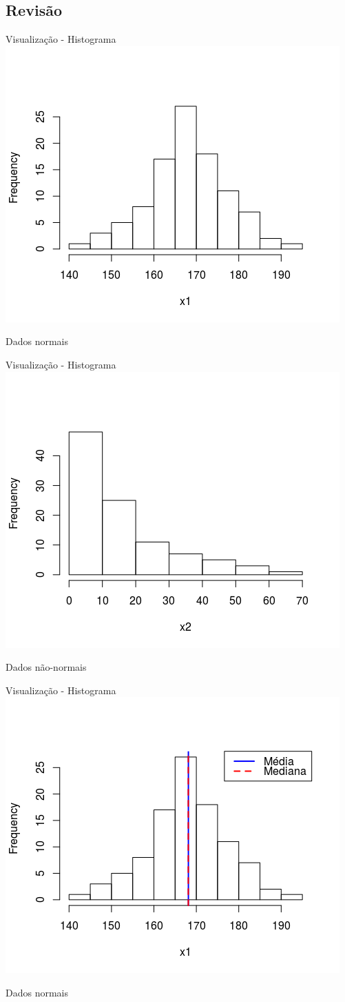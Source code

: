\documentclass{beamer}
\begin{document}
\subsection{Revisão}

\begin{frame}{Visualização - Histograma}
  \centering
  \includegraphics[width=.7\textwidth]{Nao_Param/normal1-h}

  Dados normais
\end{frame}

\begin{frame}{Visualização - Histograma}
  \centering
  \includegraphics[width=.7\textwidth]{Nao_Param/lognormal1-h}

  Dados não-normais
\end{frame}

\begin{frame}{Visualização - Histograma}
  \centering
  \includegraphics[width=.7\textwidth]{Nao_Param/normal2-h}

  Dados normais
\end{frame}
\end{document}
